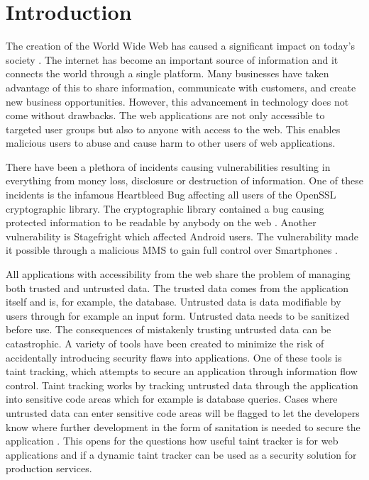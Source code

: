 \chapter{Introduction}
\label{Introduction}
The creation of the World Wide Web has caused a significant impact on today's society \parencite{www}. The internet has become an important source of information and it connects the world through a single platform. Many businesses have taken advantage of this to share information, communicate with customers, and create new business opportunities. However, this advancement in technology does not come without drawbacks. The web applications are not only accessible to targeted user groups but also to anyone with access to the web. This enables malicious users to abuse and cause harm to other users of web applications. 

There have been a plethora of incidents causing vulnerabilities resulting in everything from money loss, disclosure or destruction of information. One of these incidents is the infamous Heartbleed Bug affecting all users of the OpenSSL cryptographic library. The cryptographic library contained a bug causing protected information to be readable by anybody on the web \parencite{Heartbleed}. Another vulnerability is Stagefright which affected Android users. The vulnerability made it possible through a malicious MMS to gain full control over Smartphones \parencite{2015ASvt}. 

All applications with accessibility from the web share the problem of managing both trusted and untrusted data. The trusted data comes from the application itself and is, for example, the database. Untrusted data is data modifiable by users through for example an input form. Untrusted data needs to be sanitized before use. The consequences of mistakenly trusting untrusted data can be catastrophic. A variety of tools have been created to minimize the risk of accidentally introducing security flaws into applications. One of these tools is taint tracking, which attempts to secure an application through information flow control. Taint tracking works by tracking untrusted data through the application into sensitive code areas which for example is database queries. Cases where untrusted data can enter sensitive code areas will be flagged to let the developers know where further development in the form of sanitation is needed to secure the application \parencite{Pan2015, Venkataramani2008}. This opens for the questions how useful taint tracker is for web applications and if a dynamic taint tracker can be used as a security solution for production services.



